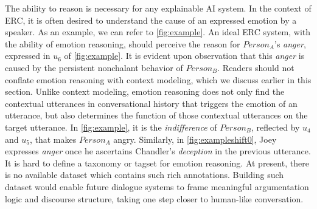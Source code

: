 \documentclass{IEEEtran}\usepackage[pdftex]{graphicx}
\begin{document}
	The ability to reason is necessary for any explainable AI system. In the context of ERC, it is often desired to understand the cause of an expressed emotion by a speaker. As an example, we can refer to \cref{fig:example}. An ideal ERC system, with the ability of emotion reasoning, should perceive the reason for $Person_A$'s \textit{anger}, expressed in $u_6$ of \cref{fig:example}. It is evident upon observation that this \textit{anger} is caused by the persistent nonchalant behavior of $Person_{B}$. Readers should not conflate emotion reasoning with context modeling, which we discuss earlier in this section. Unlike context modeling, emotion reasoning does not only find the contextual utterances in conversational history that triggers the emotion of an utterance, but also determines the function of those contextual utterances on the target utterance. In \cref{fig:example}, it is the \emph{indifference} of $Person_{B}$, reflected by $u_4$ and $u_5$, that makes $Person_{A}$ angry. Similarly, in \cref{fig:exampleshift0}, Joey expresses \emph{anger} once he ascertains Chandler's \emph{deception} in the previous utterance. It is hard to define a taxonomy or tagset for emotion reasoning. At present, there is no available dataset which contains such rich annotations. Building such dataset would enable future dialogue systems to frame meaningful argumentation logic and discourse structure, taking one step closer to human-like conversation. 
\end{document}
